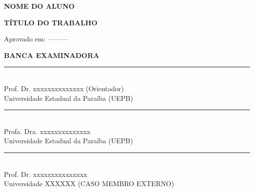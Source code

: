 \documentclass[12pt, a4paper]{report}
\theoremstyle{remark}
\theoremstyle{definition}
\theoremstyle{definition}
\theoremstyle{plain}
\theoremstyle{plain}
\theoremstyle{plain}
\theoremstyle{definition}
\begin{document}

\thispagestyle{empty}
\begin{center}
\textbf{NOME DO ALUNO}

\vspace{1cm}

\textbf{TÍTULO DO TRABALHO}

\end{center}

\vspace{.4cm}
\begin{flushright}
\parbox{8cm}{
}
\end{flushright}

\vspace{.6cm}

\noindent Aprovado em: ---------

\vspace{1.5cm}

\begin{center}
\textbf{BANCA EXAMINADORA}
\vspace{1.5cm}

\noindent\rule{12cm}{0.4pt} \\
Prof. Dr. xxxxxxxxxxxxxx (Orientador)\\
Universidade Estadual da Paraíba (UEPB)
\vspace{2cm}

\noindent\rule{12cm}{0.4pt}\\
Profa. Dra. xxxxxxxxxxxxxx  \\
Universidade Estadual da Paraíba (UEPB)
\vspace{2cm}

\noindent\rule{12cm}{0.4pt}\\
Prof. Dr. xxxxxxxxxxxxxxx \\
Universidade XXXXXX (CASO MEMBRO EXTERNO)
\vspace{2cm}

\end{center}

\end{document}
